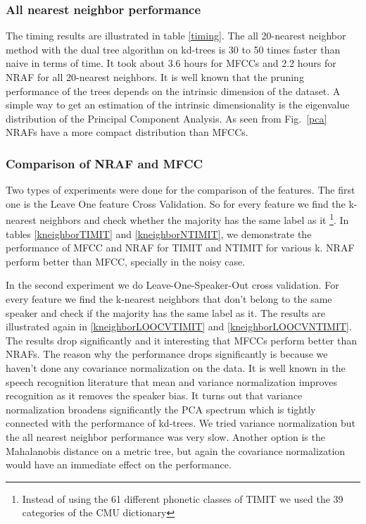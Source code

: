 \documentclass[12pt,letterpaper,doublespaced,ETD,dvips,proposal]{gtthesis}
\begin{document}
\begin{Body}
\subsubsection{All nearest neighbor performance}
The timing results are illustrated in table \ref{timing}. The all
20-nearest neighbor method with the dual tree algorithm on kd-trees
is 30 to 50 times faster than naive in terms of time. It took about
3.6 hours for MFCCs and 2.2 hours for NRAF for all 20-nearest
neighbors. It is well known that the pruning performance of the
trees depends on the intrinsic dimension of the dataset. A simple
way to get an estimation of the intrinsic dimensionality is the
eigenvalue distribution of the Principal Component Analysis. As seen
from Fig.~\ref{pca} NRAFs have a more compact distribution than
MFCCs.

\subsubsection{Comparison of NRAF and MFCC} Two types of
experiments were done for the comparison of the features. The first
one is the Leave One feature Cross Validation. So for every feature
we find the k-nearest neighbors and check whether the majority has
the same label as it \footnote{Instead of using the 61 different
phonetic classes of TIMIT we used the 39 categories of the CMU
dictionary}. In tables \ref{kneighborTIMIT} and
\ref{kneighborNTIMIT}, we demonstrate the performance of MFCC and
NRAF for TIMIT and NTIMIT for various k. NRAF perform better than
MFCC, specially in the noisy case.

In the second experiment we do Leave-One-Speaker-Out cross
validation. For every feature we find the k-nearest neighbors that
don't belong to the same speaker and check if the majority has the
same label as it. The results are illustrated again in
\ref{kneighborLOOCVTIMIT} and \ref{kneighborLOOCVNTIMIT}. The
results drop significantly and it interesting that MFCCs perform
better than NRAFs. The reason why the performance drops
significantly is because we haven't done any covariance
normalization on the data. It is well known in the speech
recognition literature that mean and variance normalization improves
recognition as it removes the speaker bias. It turns out that
variance normalization broadens significantly the PCA spectrum which
is tightly connected with the performance of kd-trees. We tried
variance normalization but the all nearest neighbor performance was
very slow. Another option is the Mahalanobis distance on a metric
tree, but again the covariance normalization would have an immediate
effect on the performance.


\end{Body}
\end{document}
